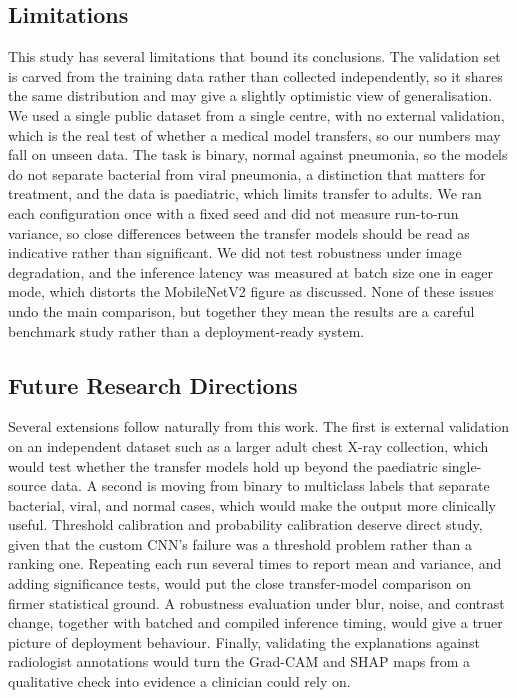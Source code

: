 \documentclass[preprint,12pt]{elsarticle}
\begin{document}
\subsection{Limitations}
This study has several limitations that bound its conclusions.
The validation set is carved from the training data rather than collected independently, so it shares the same distribution and may give a slightly optimistic view of generalisation.
We used a single public dataset from a single centre, with no external validation, which is the real test of whether a medical model transfers, so our numbers may fall on unseen data.
The task is binary, normal against pneumonia, so the models do not separate bacterial from viral pneumonia, a distinction that matters for treatment, and the data is paediatric, which limits transfer to adults.
We ran each configuration once with a fixed seed and did not measure run-to-run variance, so close differences between the transfer models should be read as indicative rather than significant.
We did not test robustness under image degradation, and the inference latency was measured at batch size one in eager mode, which distorts the MobileNetV2 figure as discussed.
None of these issues undo the main comparison, but together they mean the results are a careful benchmark study rather than a deployment-ready system.

\subsection{Future Research Directions}
Several extensions follow naturally from this work.
The first is external validation on an independent dataset such as a larger adult chest X-ray collection, which would test whether the transfer models hold up beyond the paediatric single-source data.
A second is moving from binary to multiclass labels that separate bacterial, viral, and normal cases, which would make the output more clinically useful.
Threshold calibration and probability calibration deserve direct study, given that the custom CNN's failure was a threshold problem rather than a ranking one.
Repeating each run several times to report mean and variance, and adding significance tests, would put the close transfer-model comparison on firmer statistical ground.
A robustness evaluation under blur, noise, and contrast change, together with batched and compiled inference timing, would give a truer picture of deployment behaviour.
Finally, validating the explanations against radiologist annotations would turn the Grad-CAM and SHAP maps from a qualitative check into evidence a clinician could rely on.
\end{document}
